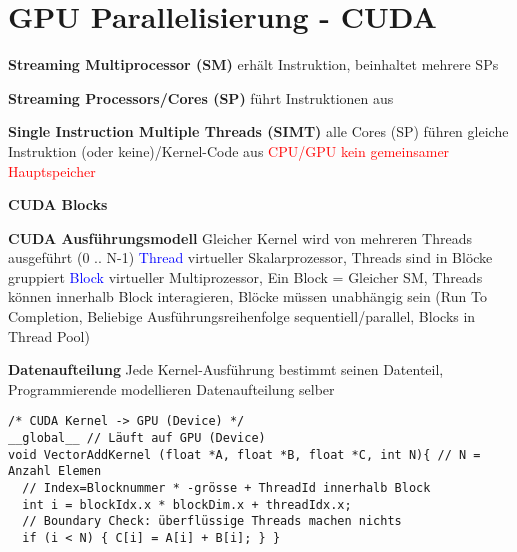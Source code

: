 \section{GPU Parallelisierung - CUDA}

\textbf{Streaming Multiprocessor (SM)} erhält Instruktion, beinhaltet mehrere SPs

\textbf{Streaming Processors/Cores (SP)} führt Instruktionen aus

\textbf{Single Instruction Multiple Threads (SIMT)} alle Cores (SP) führen gleiche Instruktion (oder keine)/Kernel-Code aus \textcolor{red}{CPU/GPU kein gemeinsamer Hauptspeicher}

\textbf{CUDA Blocks}

\textbf{CUDA Ausführungsmodell} Gleicher Kernel wird von mehreren Threads ausgeführt (0 .. N-1) \textcolor{blue}{Thread} virtueller Skalarprozessor, Threads sind in Blöcke gruppiert \textcolor{blue}{Block} virtueller Multiprozessor, Ein Block = Gleicher SM, Threads können innerhalb Block interagieren, Blöcke müssen unabhängig sein (Run To Completion, Beliebige Ausführungsreihenfolge sequentiell/parallel, Blocks in Thread Pool)

\textbf{Datenaufteilung} Jede Kernel-Ausführung bestimmt seinen Datenteil, Programmierende modellieren Datenaufteilung selber

\begin{lstlisting}
/* CUDA Kernel -> GPU (Device) */
__global__ // Läuft auf GPU (Device)
void VectorAddKernel (float *A, float *B, float *C, int N){ // N = Anzahl Elemen
  // Index=Blocknummer * -grösse + ThreadId innerhalb Block
  int i = blockIdx.x * blockDim.x + threadIdx.x;
  // Boundary Check: überflüssige Threads machen nichts
  if (i < N) { C[i] = A[i] + B[i]; } }
\end{lstlisting}

